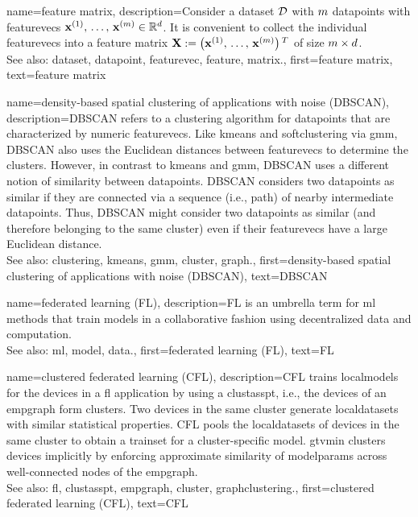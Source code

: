 {name={feature matrix}, 
	description={Consider a \gls{dataset} $\mathcal{D}$ 
		with $m$ \glspl{datapoint} with \glspl{featurevec} 
		${\bf x}^{(1)}, \,\ldots, \,{\bf x}^{(m)} \in \mathbb{R}^{d}$. 
		It is convenient to collect the individual \glspl{featurevec} into a \gls{feature} 
		\gls{matrix} ${\bf X} := \big({\bf x}^{(1)}, \,\ldots, \,{\bf x}^{(m)}\big)\,^{T}$ 
		of size $m \times d$.
				\\
		See also: \gls{dataset}, \gls{datapoint}, \gls{featurevec}, \gls{feature}, \gls{matrix}.},
	first={feature matrix},
	text={feature matrix} 
}

{name={density-based spatial clustering of applications with noise (DBSCAN)}, 
	description={DBSCAN 
		refers to a \gls{clustering} \gls{algorithm} for \glspl{datapoint} that are characterized by numeric \glspl{featurevec}. 
		Like \gls{kmeans} and \gls{softclustering} via \gls{gmm}, DBSCAN also uses the Euclidean 
		distances between \glspl{featurevec} to determine the \glspl{cluster}. However, in contrast to \gls{kmeans} 
		and \gls{gmm}, DBSCAN uses a different notion of similarity between \glspl{datapoint}. 
		DBSCAN considers two \glspl{datapoint} as similar if they are connected 
		via a sequence (i.e., path) of nearby intermediate \glspl{datapoint}. Thus, DBSCAN might consider 
		two \glspl{datapoint} as similar (and therefore belonging to the same cluster) even if 
		their \glspl{featurevec} have a large Euclidean distance.
				\\
		See also: \gls{clustering}, \gls{kmeans}, \gls{gmm}, \gls{cluster}, \gls{graph}.},
	first={density-based spatial clustering of applications with noise (DBSCAN)},
	text={DBSCAN} 
}

{name={federated learning (FL)}, 
	description={FL 
		is an umbrella term for \gls{ml} methods that train \glspl{model} in a collaborative 
		fashion using decentralized \gls{data} and computation.
				\\
		See also: \gls{ml}, \gls{model}, \gls{data}.},
	first={federated learning (FL)},
	text={FL} 
}
	
{name={clustered federated learning (CFL)}, 
	description={CFL trains \glspl{localmodel} for the 
 		\glspl{device} in a \gls{fl} application by using a \gls{clustasspt}, i.e., the \glspl{device} 
 		of an \gls{empgraph} form \glspl{cluster}. Two \glspl{device} in the same \gls{cluster} generate 
 		\glspl{localdataset} with similar statistical properties. CFL pools the \glspl{localdataset} of \glspl{device} 
 		in the same \gls{cluster} to obtain a \gls{trainset} for a \gls{cluster}-specific \gls{model}. 
 		\Gls{gtvmin} clusters \glspl{device} implicitly by enforcing approximate similarity of \glspl{modelparam} 
 		across well-connected nodes of the \gls{empgraph}.\\ 
 		See also: \gls{fl}, \gls{clustasspt}, \gls{empgraph}, \gls{cluster}, \gls{graphclustering}.},
	first={clustered federated learning (CFL)},
	text={CFL} 
}

